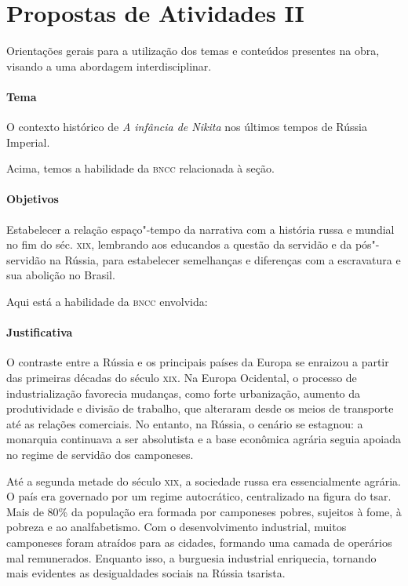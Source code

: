 \documentclass[11pt]{extarticle}
\begin{document}
\section{Propostas de Atividades II}

Orientações gerais para a utilização dos temas e conteúdos
presentes na obra, visando a uma abordagem interdisciplinar.

\paragraph{Tema} O contexto histórico de \emph{A infância de Nikita} nos últimos tempos de Rússia Imperial.


Acima, temos a habilidade da \textsc{bncc} relacionada à seção.

\paragraph{Objetivos}
Estabelecer a relação espaço"-tempo da narrativa com a história russa e
mundial no fim do séc. \textsc{xix}, lembrando aos educandos a questão da
servidão e da pós"-servidão na Rússia, para estabelecer semelhanças e
diferenças com a escravatura e sua abolição no Brasil.

Aqui está a habilidade da \textsc{bncc} envolvida:


\paragraph{Justificativa}
O contraste entre a Rússia e os principais países da Europa se enraizou
a partir das primeiras décadas do século \textsc{xix}. Na Europa Ocidental, o
processo de industrialização favorecia mudanças, como forte urbanização,
aumento da produtividade e divisão de trabalho, que alteraram desde os
meios de transporte até as relações comerciais. No entanto, na Rússia, o
cenário se estagnou: a monarquia continuava a ser absolutista e a base
econômica agrária seguia apoiada no regime de servidão dos camponeses.

Até a segunda metade do século \textsc{xix}, a sociedade russa era essencialmente
agrária. O país era governado por um regime autocrático, centralizado na
figura do tsar. Mais de 80\% da população era formada por camponeses
pobres, sujeitos à fome, à pobreza e ao analfabetismo. Com o
desenvolvimento industrial, muitos camponeses foram atraídos para as
cidades, formando uma camada de operários mal remunerados. Enquanto
isso, a burguesia industrial enriquecia, tornando mais evidentes as
desigualdades sociais na Rússia tsarista.
\end{document}
